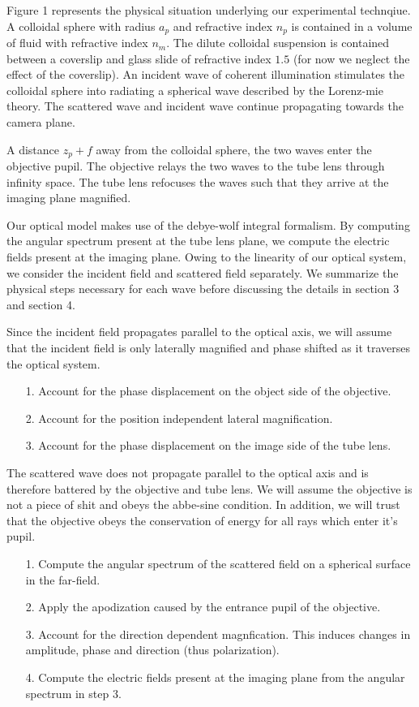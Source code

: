 Figure 1 represents the physical situation underlying our experimental technqiue. A colloidal sphere with radius $a_p$ and refractive index $n_p$ is contained in a volume of fluid with refractive index $n_m$. The dilute colloidal suspension is contained between a coverslip and glass slide of refractive index $1.5$ (for now we neglect the effect of the coverslip). An incident wave of coherent illumination stimulates the colloidal sphere into radiating a spherical wave described by the Lorenz-mie theory. The scattered wave and incident wave continue propagating towards the camera plane.

A distance $z_p + f$ away from the colloidal sphere, the two waves enter the objective pupil. The objective relays the two waves to the tube lens through infinity space. The tube lens refocuses the waves such that they arrive at the imaging plane magnified.

Our optical model makes use of the debye-wolf integral formalism. By computing the angular spectrum present at the tube lens plane, we compute the electric fields present at the imaging plane. Owing to the linearity of our optical system,
we consider the incident field and scattered field separately. We summarize the physical steps necessary for each wave before discussing the details in section 3 and section 4.

Since the incident field propagates parallel to the optical axis, we will assume that the incident field is only laterally magnified and phase shifted as it traverses the optical system.
\begin{enumerate}
\item[1.] Account for the phase displacement on the object side of the objective.
\item[2.] Account for the position independent lateral magnification.
\item[3.] Account for the phase displacement on the image side of the tube lens.
\end{enumerate}
The scattered wave does not propagate parallel to the optical axis and is therefore battered by the objective and tube lens. We will assume the objective is not a piece of shit and obeys the abbe-sine condition. In addition, we will trust that the objective obeys the conservation of energy for all rays which enter it's pupil.
\begin{enumerate}
\item[1.] Compute the angular spectrum of the scattered field on a spherical surface in the far-field.
\item[2.] Apply the apodization caused by the entrance pupil of the objective.
\item[3.] Account for the direction dependent magnfication. This induces changes in amplitude, phase and direction (thus polarization).
\item[4.] Compute the electric fields present at the imaging plane from the angular spectrum in step 3.
\end{enumerate}

